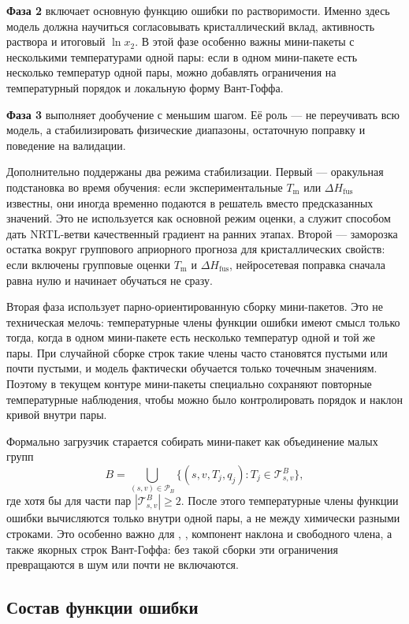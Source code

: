 \documentclass[11pt]{article}
\DeclareRobustCommand{\code}[1]{\texttt{\detokenize{#1}}}
\newcommand{\Tm}{T_{\mathrm m}}
\newcommand{\dHfus}{\Delta H_{\mathrm{fus}}}
\theoremstyle{definition}
\begin{document}
\textbf{Фаза 2} включает основную функцию ошибки по растворимости. Именно здесь модель должна научиться согласовывать кристаллический вклад, активность раствора и итоговый $\ln x_2$. В этой фазе особенно важны мини-пакеты с несколькими температурами одной пары: если в одном мини-пакете есть несколько температур одной пары, можно добавлять ограничения на температурный порядок и локальную форму Вант-Гоффа.

\textbf{Фаза 3} выполняет дообучение с меньшим шагом. Её роль --- не переучивать всю модель, а стабилизировать физические диапазоны, остаточную поправку и поведение на валидации.

Дополнительно поддержаны два режима стабилизации. Первый --- оракульная подстановка во время обучения: если экспериментальные $\Tm$ или $\dHfus$ известны, они иногда временно подаются в решатель вместо предсказанных значений. Это не используется как основной режим оценки, а служит способом дать NRTL-ветви качественный градиент на ранних этапах. Второй --- заморозка остатка вокруг группового априорного прогноза для кристаллических свойств: если включены групповые оценки $\Tm$ и $\dHfus$, нейросетевая поправка сначала равна нулю и начинает обучаться не сразу.

Вторая фаза использует парно-ориентированную сборку мини-пакетов. Это не техническая мелочь: температурные члены функции ошибки имеют смысл только тогда, когда в одном мини-пакете есть несколько температур одной и той же пары. При случайной сборке строк такие члены часто становятся пустыми или почти пустыми, и модель фактически обучается только точечным значениям. Поэтому в текущем контуре мини-пакеты специально сохраняют повторные температурные наблюдения, чтобы можно было контролировать порядок и наклон кривой внутри пары.

Формально загрузчик старается собирать мини-пакет как объединение малых групп
\begin{equation*}
    B=\bigcup_{(s,v)\in\mathcal P_B}
    \{(s,v,T_j,q_j):T_j\in\mathcal T_{s,v}^{B}\},
\end{equation*}
где хотя бы для части пар $|\mathcal T_{s,v}^{B}|\ge 2$. После этого температурные члены функции ошибки вычисляются только внутри одной пары, а не между химически разными строками. Это особенно важно для \code{pair\_temp\_rank}, \code{vant\_hoff\_local}, компонент наклона и свободного члена, а также якорных строк Вант-Гоффа: без такой сборки эти ограничения превращаются в шум или почти не включаются.

\subsection{Состав функции ошибки}
\end{document}
